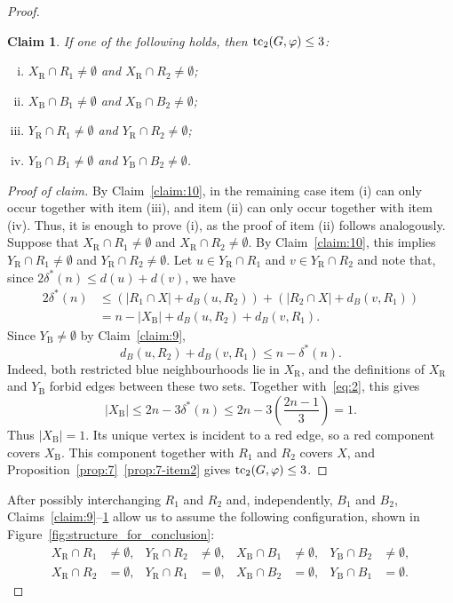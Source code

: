 \documentclass[12pt,reqno,a4paper]{amsart}
\newtheorem{claim}[theorem] {Claim}
\newenvironment{claimproof}[1][Proof of claim]{\begin{proof}[#1]\renewcommand{\qedsymbol}{$\scriptstyle\square$}}{\end{proof}}
\def\tc{\mathop{\text{\rm tc}}\nolimits}
\newcommand{\R}{\mathrm{R}}
\newcommand{\B}{\mathrm{B}}
\begin{document}
\begin{proof}
\begin{claim}\label{claim:11}
If one of the following holds, then $\tc_2(G,\varphi) \le 3$:
\begin{enumerate}[(i)]
\item $X_{\R} \cap R_1 \neq \emptyset$ and $X_{\R} \cap R_2 \neq \emptyset$;
\item $X_{\B} \cap B_1 \neq \emptyset$ and $X_{\B} \cap B_2 \neq \emptyset$;
\item $Y_{\R} \cap R_1 \neq \emptyset$ and $Y_{\R} \cap R_2 \neq \emptyset$;
\item $Y_{\B} \cap B_1 \neq \emptyset$ and $Y_{\B} \cap B_2 \neq \emptyset$.
\end{enumerate}
\end{claim}
\begin{claimproof}
By Claim~\ref{claim:10}, in the remaining case item (i) can only occur together
with item (iii), and item (ii) can only occur together with item (iv). Thus, it
is enough to prove (i), as the proof of item (ii) follows analogously. Suppose
that $X_{\R} \cap R_1 \neq \emptyset$ and $X_{\R} \cap R_2 \neq \emptyset$. By
Claim~\ref{claim:10}, this implies $Y_{\R} \cap R_1 \neq \emptyset$ and $Y_{\R}
\cap R_2 \neq \emptyset$. Let $u \in Y_{\R} \cap R_1$ and $v \in Y_{\R} \cap
R_2$ and note that, since $2\delta^*(n) \le d(u) + d(v)$, we have
\begin{equation}\label{eq:2}
\begin{aligned}
2\delta^*(n) &\le (|R_1 \cap X| + d_B(u, R_2)) + (|R_2 \cap X| + d_B(v, R_1)) \\
&= n - |X_{\B}| + d_B(u, R_2) + d_B(v, R_1).
\end{aligned}
\end{equation}
Since $Y_{\B}\neq\emptyset$ by Claim~\ref{claim:9},
\[
d_B(u,R_2)+d_B(v,R_1)\le n-\delta^*(n).
\]
Indeed, both restricted blue neighbourhoods lie in $X_{\R}$, and the
definitions of $X_{\R}$ and $Y_{\B}$ forbid edges between these two sets. Together with~\eqref{eq:2},
this gives
\begin{equation*}
|X_{\B}| \le 2n - 3\delta^*(n) \le 2n - 3\left(\frac{2n-1}{3}\right) = 1.
\end{equation*}
Thus $|X_{\B}|=1$. Its unique vertex is incident to a red edge, so a red
component covers $X_{\B}$. This component together with $R_1$ and $R_2$ covers $X$, and
Proposition~\ref{prop:7}~\ref{prop:7-item2} gives $\tc_2(G,\varphi) \le 3$.
\end{claimproof}

After possibly interchanging $R_1$ and $R_2$ and, independently, $B_1$ and
$B_2$, Claims~\ref{claim:9}--\ref{claim:11} allow us to assume the following
configuration, shown in Figure~\ref{fig:structure_for_conclusion}:
\begin{equation}\label{eq:3}
\begin{aligned}
X_{\R}\cap R_1&\neq\emptyset, & Y_{\R}\cap R_2&\neq\emptyset,
& X_{\B}\cap B_1&\neq\emptyset, & Y_{\B}\cap B_2&\neq\emptyset,\\
X_{\R}\cap R_2&=\emptyset, & Y_{\R}\cap R_1&=\emptyset,
& X_{\B}\cap B_2&=\emptyset, & Y_{\B}\cap B_1&=\emptyset.
\end{aligned}
\end{equation}


\end{proof}
\end{document}
